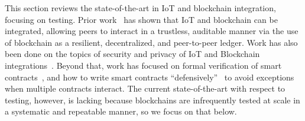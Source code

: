 This section reviews the state-of-the-art in IoT and blockchain integration,  focusing on testing. Prior work~\cite{christidis2016blockchains} has shown that IoT and blockchain can be integrated, allowing peers to interact in a trustless, auditable manner via the use of blockchain as a resilient, decentralized, and peer-to-peer ledger. Work has also been done on the topics of security and privacy of IoT and Blockchain integrations~\cite{dorri2017blockchain,ouaddah2017towards}. Beyond that, work has focused on formal verification of smart contracts~\cite{kumaresan2014use}, and how to write smart contracts ``defensively''~\cite{delmolino2016step} to avoid exceptions when multiple contracts interact. The current state-of-the-art with respect to testing, however, is lacking because blockchains are infrequently tested at scale in a systematic and repeatable manner, so we focus on that below.


% 
% 



